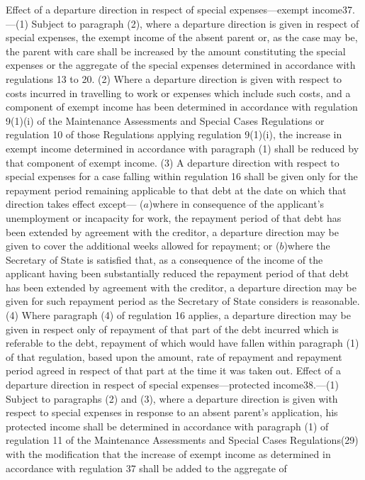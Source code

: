 \documentclass[a4paper]{article}
\begin{document}
Effect of a departure direction in respect of special expenses—exempt
income37.—(1) Subject to paragraph (2), where a departure direction is given in
respect of special expenses, the exempt income of the absent parent or, as the
case may be, the parent with care shall be increased by the amount constituting
the special expenses or the aggregate of the special expenses determined in
accordance with regulations 13 to 20.
(2) Where a departure direction is given with respect to costs incurred in
travelling to work or expenses which include such costs, and a component of
exempt income has been determined in accordance with regulation 9(1)(i) of the
Maintenance Assessments and Special Cases Regulations or regulation 10 of those
Regulations applying regulation 9(1)(i), the increase in exempt income
determined in accordance with paragraph (1) shall be reduced by that component
of exempt income.
(3) A departure direction with respect to special expenses for a case falling
within regulation 16 shall be given only for the repayment period remaining
applicable to that debt at the date on which that direction takes effect except—
($a$)where in consequence of the applicant’s unemployment or incapacity for work,
the repayment period of that debt has been extended by agreement with the
creditor, a departure direction may be given to cover the additional weeks
allowed for repayment; or
($b$)where the Secretary of State is satisfied that, as a consequence of the
income of the applicant having been substantially reduced the repayment period
of that debt has been extended by agreement with the creditor, a departure
direction may be given for such repayment period as the Secretary of State
considers is reasonable.
(4) Where paragraph (4) of regulation 16 applies, a departure direction may be
given in respect only of repayment of that part of the debt incurred which is
referable to the debt, repayment of which would have fallen within paragraph (1)
of that regulation, based upon the amount, rate of repayment and repayment
period agreed in respect of that part at the time it was taken out.
Effect of a departure direction in respect of special expenses—protected
income38.—(1) Subject to paragraphs (2) and (3), where a departure direction is
given with respect to special expenses in response to an absent parent’s
application, his protected income shall be determined in accordance with
paragraph (1) of regulation 11 of the Maintenance Assessments and Special Cases
Regulations(29) with the modification that the increase of exempt income as
determined in accordance with regulation 37 shall be added to the aggregate of
\end{document}
